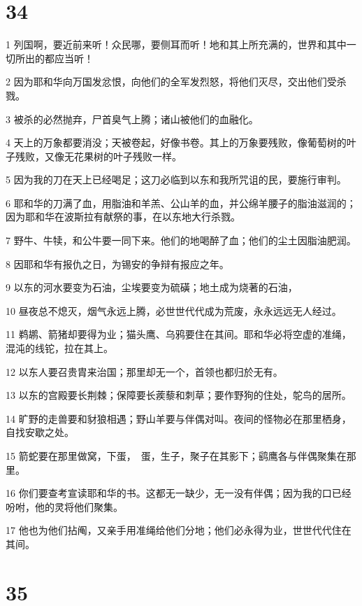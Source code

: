 \chapter{34}

\par 1 列国啊，要近前来听！众民哪，要侧耳而听！地和其上所充满的，世界和其中一切所出的都应当听！
\par 2 因为耶和华向万国发忿恨，向他们的全军发烈怒，将他们灭尽，交出他们受杀戮。
\par 3 被杀的必然抛弃，尸首臭气上腾；诸山被他们的血融化。
\par 4 天上的万象都要消没；天被卷起，好像书卷。其上的万象要残败，像葡萄树的叶子残败，又像无花果树的叶子残败一样。
\par 5 因为我的刀在天上已经喝足；这刀必临到以东和我所咒诅的民，要施行审判。
\par 6 耶和华的刀满了血，用脂油和羊羔、公山羊的血，并公绵羊腰子的脂油滋润的；因为耶和华在波斯拉有献祭的事，在以东地大行杀戮。
\par 7 野牛、牛犊，和公牛要一同下来。他们的地喝醉了血；他们的尘土因脂油肥润。
\par 8 因耶和华有报仇之日，为锡安的争辩有报应之年。
\par 9 以东的河水要变为石油，尘埃要变为硫磺；地土成为烧著的石油，
\par 10 昼夜总不熄灭，烟气永远上腾，必世世代代成为荒废，永永远远无人经过。
\par 11 鹈鹕、箭猪却要得为业；猫头鹰、乌鸦要住在其间。耶和华必将空虚的准绳，混沌的线铊，拉在其上。
\par 12 以东人要召贵胄来治国；那里却无一个，首领也都归於无有。
\par 13 以东的宫殿要长荆棘；保障要长蒺藜和刺草；要作野狗的住处，鸵鸟的居所。
\par 14 旷野的走兽要和豺狼相遇；野山羊要与伴偶对叫。夜间的怪物必在那里栖身，自找安歇之处。
\par 15 箭蛇要在那里做窝，下蛋，　蛋，生子，聚子在其影下；鹞鹰各与伴偶聚集在那里。
\par 16 你们要查考宣读耶和华的书。这都无一缺少，无一没有伴偶；因为我的口已经吩咐，他的灵将他们聚集。
\par 17 他也为他们拈阄，又亲手用准绳给他们分地；他们必永得为业，世世代代住在其间。

\chapter{35}

